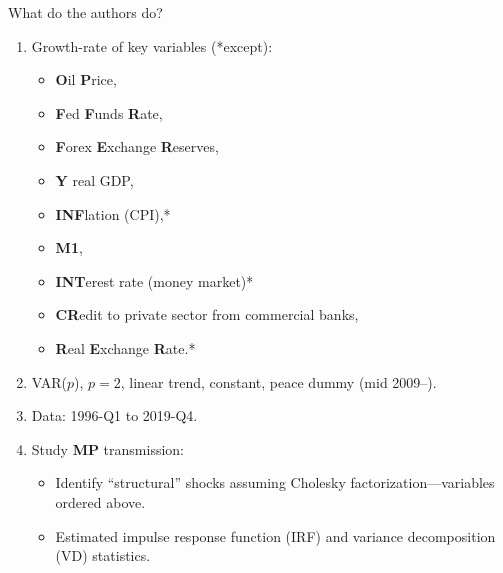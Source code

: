 \documentclass[10pt,english,slidetop,compress,
              blue,mathserif,color=option]{beamer}
\theoremstyle{plain}
\theoremstyle{definition}
\begin{document}
\begin{frame}{What do the authors do?}
  \begin{enumerate}
    \item Growth-rate of key variables (*except): 
      \begin{itemize}
        \item \textbf{O}il \textbf{P}rice, 
        \item \textbf{F}ed \textbf{F}unds \textbf{R}ate, 
        \item \textbf{F}orex \textbf{E}xchange \textbf{R}eserves, 
        \item \textbf{Y} real GDP,
        \item \textbf{INF}lation (CPI),*
        \item \textbf{M1},
        \item \textbf{INT}erest rate (money market)*
        \item \textbf{CR}edit to private sector from commercial banks,
        \item \textbf{R}eal \textbf{E}xchange \textbf{R}ate.*
      \end{itemize}
    \item VAR($p$), $p=2$, linear trend, constant, peace dummy (mid 2009--).
    \item Data: 1996-Q1 to 2019-Q4.
    \item Study \textbf{MP} transmission:
      \begin{itemize}
        \item Identify ``structural'' shocks assuming Cholesky factorization---variables ordered above.
        \item Estimated impulse response function (IRF) and variance decomposition (VD) statistics.
      \end{itemize}
  \end{enumerate}
\end{frame}
\end{document}
